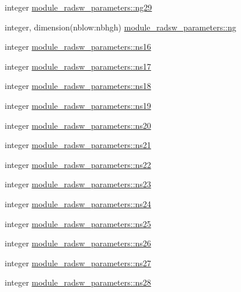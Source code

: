 \begin{DoxyCompactItemize}
integer \hyperlink{group__module__radsw__main_gaa53b1af0366b40653a6f0868858b9f3d}{module\+\_\+radsw\+\_\+parameters\+::ng29}
\item 
integer, dimension(nblow\+:nbhgh) \hyperlink{group__module__radsw__main_gaff9670cd3f5bef92ca998e491e28986e}{module\+\_\+radsw\+\_\+parameters\+::ng}
\item 
integer \hyperlink{group__module__radsw__main_ga3e6e310ecc531e2d0db52864468dc4a7}{module\+\_\+radsw\+\_\+parameters\+::ns16}
\item 
integer \hyperlink{group__module__radsw__main_ga08303e69e406f6bb2af252b1b7dff272}{module\+\_\+radsw\+\_\+parameters\+::ns17}
\item 
integer \hyperlink{group__module__radsw__main_ga142f7aa9f12272d721cfeae2855eec49}{module\+\_\+radsw\+\_\+parameters\+::ns18}
\item 
integer \hyperlink{group__module__radsw__main_gab666e8da69b308ae5b09e187b8153518}{module\+\_\+radsw\+\_\+parameters\+::ns19}
\item 
integer \hyperlink{group__module__radsw__main_gad63ddbb0abcaeda56220a624a62a7336}{module\+\_\+radsw\+\_\+parameters\+::ns20}
\item 
integer \hyperlink{group__module__radsw__main_ga63b1d13965acda2c131123f67fe456ea}{module\+\_\+radsw\+\_\+parameters\+::ns21}
\item 
integer \hyperlink{group__module__radsw__main_ga194fffaa7b04c97d8133a9e5686e94d5}{module\+\_\+radsw\+\_\+parameters\+::ns22}
\item 
integer \hyperlink{group__module__radsw__main_ga547ab92fedb3e35198b384f0337a752c}{module\+\_\+radsw\+\_\+parameters\+::ns23}
\item 
integer \hyperlink{group__module__radsw__main_ga3cdaa790f548b6407ba586a824c5edc6}{module\+\_\+radsw\+\_\+parameters\+::ns24}
\item 
integer \hyperlink{group__module__radsw__main_gabaf12fd8281745e299a942530cef1a97}{module\+\_\+radsw\+\_\+parameters\+::ns25}
\item 
integer \hyperlink{group__module__radsw__main_ga3cf6dd031ffa5545db46bb1b54fe42b6}{module\+\_\+radsw\+\_\+parameters\+::ns26}
\item 
integer \hyperlink{group__module__radsw__main_ga801c6d2223877ddf3f633dc7ffcd528b}{module\+\_\+radsw\+\_\+parameters\+::ns27}
\item 
integer \hyperlink{group__module__radsw__main_gac2b720c6b0ab80759cfe83aa53fb4540}{module\+\_\+radsw\+\_\+parameters\+::ns28}
\item 

\end{DoxyCompactItemize}

